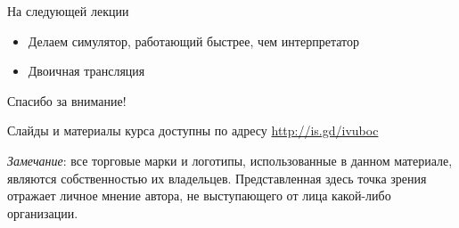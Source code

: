 \documentclass{beamer}
\begin{document}
\begin{frame}{На следующей лекции}
\begin{itemize}
\item Делаем симулятор, работающий быстрее, чем интерпретатор
\item Двоичная трансляция
\end{itemize}
\end{frame}

\begin{frame}

{\huge{Спасибо за внимание!}\par}

\vfill

Слайды и материалы курса доступны по адресу \url{http://is.gd/ivuboc} %

\vfill

\tiny{\textit{Замечание}: все торговые марки и логотипы, использованные в данном материале, являются собственностью их владельцев. Представленная здесь точка зрения отражает личное мнение автора, не выступающего от лица какой-либо организации.}

\end{frame}
\end{document}
